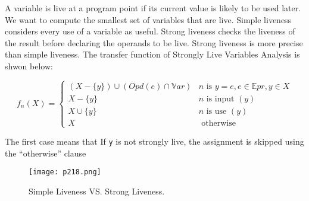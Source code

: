 A variable is live at a program
point if its current value is likely
to be used later. We want to compute the smallest
set of variables that are live. Simple liveness considers every
use of a variable as useful. Strong liveness checks the liveness
of the result before declaring the
operands to be live. Strong liveness is more precise
than simple liveness. The transfer function of Strongly Live Variables Analysis is shwon
below:


$$
	f_n(X)= \begin{cases}(X-\{y\}) \cup(Opd(e) \cap \mathbb{V}ar) & n \text { is } y=e, e \in \mathbb{E}pr, y \in X \\ X-\{y\} & n \text { is input }(y) \\ X \cup\{y\} & n \text { is use }(y) \\ X & \text { otherwise }\end{cases}
$$


The first case means that If \texttt{y} is not strongly live, the
assignment is skipped using
the “otherwise” clause

\begin{figure}[H]
	\centering
	\texttt{[image: p218.png]}
	\caption{Simple Liveness VS. Strong Liveness.}
	\label{fig:p218}
\end{figure}
